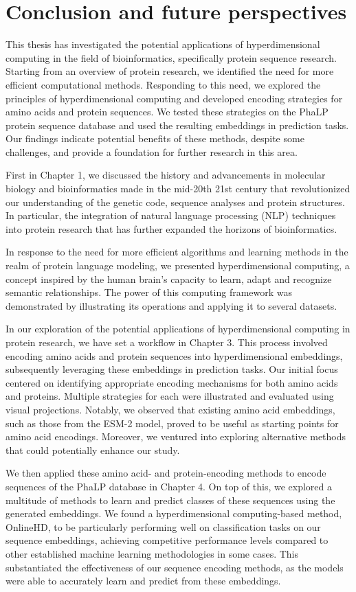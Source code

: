 \chapter{Conclusion and future perspectives}
This thesis has investigated the potential applications of hyperdimensional computing in the field of bioinformatics, specifically protein sequence research. Starting from an overview of protein research, we identified the need for more efficient computational methods. Responding to this need, we explored the principles of hyperdimensional computing and developed encoding strategies for amino acids and protein sequences. We tested these strategies on the PhaLP protein sequence database and used the resulting embeddings in prediction tasks. Our findings indicate potential benefits of these methods, despite some challenges, and provide a foundation for further research in this area.

First in Chapter 1, we discussed the history and advancements in molecular biology and bioinformatics made in the mid-20th 21st century that revolutionized our understanding of the genetic code, sequence analyses and protein structures. In particular, the integration of natural language processing (NLP) techniques into protein research that has further expanded the horizons of bioinformatics.

In response to the need for more efficient algorithms and learning methods in the realm of protein language modeling, we presented hyperdimensional computing, a concept inspired by the human brain's capacity to learn, adapt and recognize semantic relationships. The power of this computing framework was demonstrated by illustrating its operations and applying it to several datasets.

In our exploration of the potential applications of hyperdimensional computing in protein research, we have set a workflow in Chapter 3. This process involved encoding amino acids and protein sequences into hyperdimensional embeddings, subsequently leveraging these embeddings in prediction tasks. Our initial focus centered on identifying appropriate encoding mechanisms for both amino acids and proteins. Multiple strategies for each were illustrated and evaluated using visual projections. Notably, we observed that existing amino acid embeddings, such as those from the ESM-2 model, proved to be useful as starting points for amino acid encodings. Moreover, we ventured into exploring alternative methods that could potentially enhance our study.

We then applied these amino acid- and protein-encoding methods to encode sequences of the PhaLP database in Chapter 4. On top of this, we explored a multitude of methods to learn and predict classes of these sequences using the generated embeddings. We found a hyperdimensional computing-based method, OnlineHD, to be particularly performing well on classification tasks on our sequence embeddings, achieving competitive performance levels compared to other established machine learning methodologies in some cases. This substantiated the effectiveness of our sequence encoding methods, as the models were able to accurately learn and predict from these embeddings.

